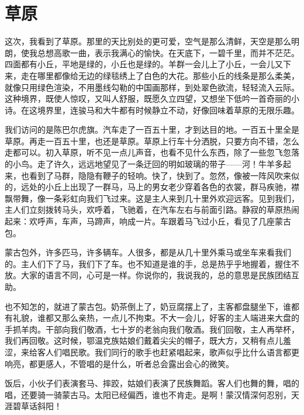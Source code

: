 \documentclass[12pt,UTF-8,openany]{ctexbook}
\begin{document}
\chapter{草原}

\begin{large}
    
    这次，我看到了草原。那里的天比别处的更可爱，空气是那么清鲜，天空是那么明朗，使我总想高歌一曲，表示我满心的愉快。在天底下，一碧千里，而并不茫茫。四面都有小丘，平地是绿的，小丘也是绿的。羊群一会儿上了小丘，一会儿又下来，走在哪里都像给无边的绿毯绣上了白色的大花。那些小丘的线条是那么柔美，就像只用绿色渲染，不用墨线勾勒的中国画那样，到处翠色欲流，轻轻流入云际。这种境界，既使人惊叹，又叫人舒服，既愿久立四望，又想坐下低吟一首奇丽的小诗。在这境界里，连骏马和大牛都有时候静立不动，好像回味着草原的无限乐趣。
    
    我们访问的是陈巴尔虎旗。汽车走了一百五十里，才到达目的地。一百五十里全是草原。再走一百五十里，也还是草原。草原上行车十分洒脱，只要方向不错，怎么走都可以。初入草原，听不见一点儿声音，也看不见什么东西，除了一些忽飞忽落的小鸟。走了许久，远远地望见了一条迂回的明如玻璃的带子——河！牛羊多起来，也看到了马群，隐隐有鞭子的轻响。快了，快到了。忽然，像被一阵风吹来似的，远处的小丘上出现了一群马，马上的男女老少穿着各色的衣裳，群马疾驰，襟飘带舞，像一条彩虹向我们飞过来。这是主人来到几十里外欢迎远客。见到我们，主人们立刻拨转马头，欢呼着，飞驰着，在汽车左右与前面引路。静寂的草原热闹起来：欢呼声，车声，马蹄声，响成一片。车跟着马飞过小丘，看见了几座蒙古包。
    
    蒙古包外，许多匹马，许多辆车。人很多，都是从几十里外乘马或坐车来看我们的。主人们下了马，我们下了车。也不知道是谁的手，总是热乎乎地握着，握住不放。大家的语言不同，心可是一样。你说你的，我说我的，总的意思是民族团结互助。
    
    也不知怎的，就进了蒙古包。奶茶倒上了，奶豆腐摆上了，主客都盘腿坐下，谁都有礼貌，谁都又那么亲热，一点儿不拘束。不大一会儿，好客的主人端进来大盘的手抓羊肉。干部向我们敬酒，七十岁的老翁向我们敬酒。我们回敬，主人再举杯，我们再回敬。这时候，鄂温克族姑娘们戴着尖尖的帽子，既大方，又稍有点儿羞涩，来给客人们唱民歌。我们同行的歌手也赶紧唱起来，歌声似乎比什么语言都更响亮，都更感人，不管唱的是什么，听者总会露出会心的微笑。
    
    饭后，小伙子们表演套马、摔跤，姑娘们表演了民族舞蹈。客人们也舞的舞，唱的唱，还要骑一骑蒙古马。太阳已经偏西，谁也不肯走。是啊！蒙汉情深何忍别，天涯碧草话斜阳！
    
\end{large}
\end{document}
